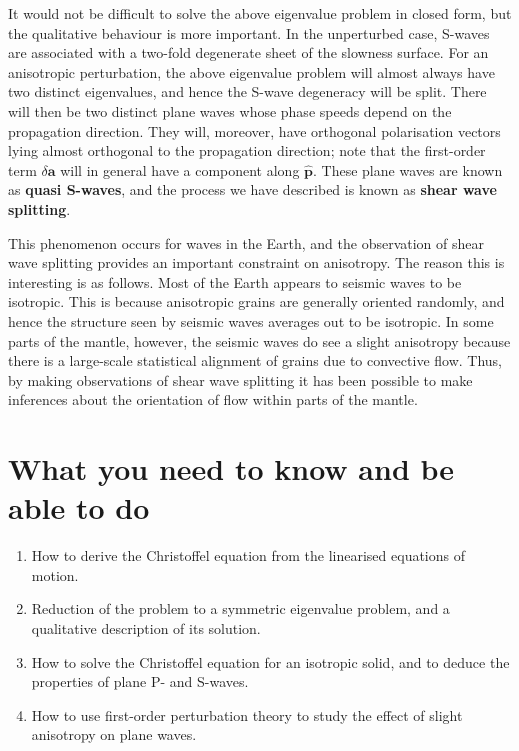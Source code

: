 It would not be difficult to solve the above eigenvalue problem in closed form, but the qualitative behaviour is more important. 
In the unperturbed case, S-waves are associated with a two-fold degenerate sheet of the slowness surface. For an 
anisotropic perturbation, the above eigenvalue problem will almost always have two distinct eigenvalues, and hence 
the S-wave degeneracy will be split. 
There will then be two distinct plane waves whose phase speeds depend on the propagation direction. They will, moreover, 
have orthogonal polarisation vectors lying almost orthogonal to the propagation direction; note that the first-order term $\delta 
\mathbf{a}$ will in general have a component 
along $\hat{\mathbf{p}}$. These plane waves are known as \textbf{quasi S-waves}, and the process we have described is 
known as \textbf{shear wave splitting}. 

This phenomenon occurs for waves in the Earth, and the observation of shear wave 
splitting provides an important constraint on anisotropy. 
The reason this is interesting is as follows. Most of the Earth appears to seismic waves to be isotropic. This is 
because anisotropic grains are generally oriented randomly, and hence the structure seen by seismic waves averages 
out to be isotropic. In some parts of the mantle, however, 
the seismic waves do see a slight anisotropy because there is a large-scale statistical alignment of grains due to 
convective flow. Thus, by making observations of shear wave splitting it has been possible to make inferences about 
the orientation of flow within parts of the mantle.


\section*{What you need to know and be able to do}
\begin{enumerate}
    \item[(i)] How to derive the Christoffel equation from the linearised equations of motion.
    \item[(ii)] Reduction of the problem to a symmetric eigenvalue problem, and a qualitative description of its solution.
    \item[(iii)] How to solve the Christoffel equation for an isotropic solid, and to deduce the properties of plane P- and S-waves.
    \item[(iv)] How to use first-order perturbation theory to study the effect of slight anisotropy on plane waves.
\end{enumerate}
